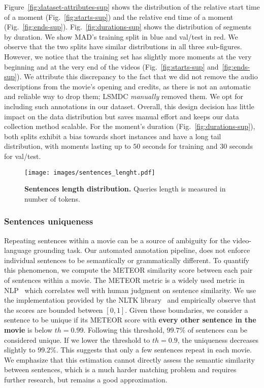 \documentclass[10pt,twocolumn,letterpaper]{article}
\begin{document}
\newpage
Figure~\ref{fig:dataset-attributes-sup} shows the distribution of the relative start time of a moment (Fig.~\ref{fig:starts-sup}) and the relative end time of a moment (Fig.~\ref{fig:ends-sup}). Fig.~\ref{fig:durations-sup} shows the distribution of segments by duration. We show MAD's training split in blue and val/test in red. We observe that the two splits have similar distributions in all three sub-figures. However, we notice that the training set has slightly more moments at the very beginning and at the very end of the videos (Fig.~\ref{fig:starts-sup} and~\ref{fig:ends-sup}). We attribute this discrepancy to the fact that we did not remove the audio descriptions from the movie's opening and credits, as there is not an automatic and reliable way to drop them; LSMDC \textit{manually} removed them. We opt for including such annotations in our dataset. Overall, this design decision has little impact on the data distribution but saves manual effort and keeps our data collection method scalable. For the moment's duration (Fig.~\ref{fig:durations-sup}), both splits exhibit a bias towards short instances and have a long tail distribution, with moments lasting up to $50$ seconds for training and $30$ seconds for val/test.
\begin{figure}[t]
    \vspace{-0.5cm}
    \centering
    \texttt{[image: images/sentences\_lenght.pdf]}
    \vspace{-0.2cm}
    \caption{\textbf{Sentences length distribution. } Queries length is measured in number of tokens. 
    }
    \label{fig:sentences_length}
    \vspace{-0.5cm}
\end{figure} 
\subsubsection{Sentences uniqueness}
Repeating sentences within a movie can be a source of ambiguity for the video-language grounding task. Our automated annotation pipeline, does not enforce individual sentences to be semantically or grammatically different. To quantify this phenomenon, we compute the METEOR similarity score between each pair of sentences within a movie.
The METEOR metric is a widely used metric in NLP~\cite{Krishna_2017_ICCV,rohrbach2014coherent} which correlates well with human judgment on sentence similarity. We use the implementation provided by the NLTK library~\cite{bird2009natural} and empirically observe that the scores are bounded between $[0,1]$. Given these boundaries, we consider a sentence to be unique if its METEOR score with \textbf{every other sentence in the movie} is below $th{=}0.99$.
Following this threshold, $99.7\%$ of sentences can be considered unique. If we lower the threshold to $th{=}0.9$, the uniqueness decreases slightly to $99.2\%$. This suggests that only a few sentences repeat in each movie. 
We emphasize that this estimation cannot directly assess the semantic similarity between sentences, which is a much harder matching problem and requires further research, but remains a good approximation. 
\end{document}
